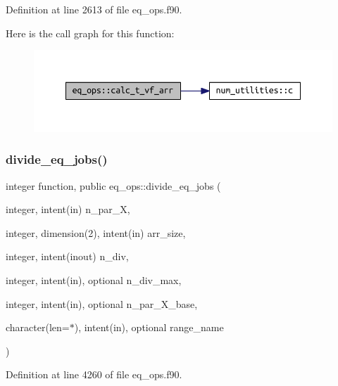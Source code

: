 Definition at line 2613 of file eq\+\_\+ops.\+f90.

Here is the call graph for this function\+:
\nopagebreak
\begin{figure}[H]
\begin{center}
\leavevmode
\includegraphics[width=350pt]{namespaceeq__ops_a9fe661ac183df2bdf7a96b4450be21aa_cgraph}
\end{center}
\end{figure}
\mbox{\label{namespaceeq__ops_a8fae749abe55865d8135fef536a8e8f1}} 
\subsubsection{\texorpdfstring{divide\+\_\+eq\+\_\+jobs()}{divide\_eq\_jobs()}}
{\footnotesize\ttfamily integer function, public eq\+\_\+ops\+::divide\+\_\+eq\+\_\+jobs (\begin{DoxyParamCaption}\item[{integer, intent(in)}]{n\+\_\+par\+\_\+X,  }\item[{integer, dimension(2), intent(in)}]{arr\+\_\+size,  }\item[{integer, intent(inout)}]{n\+\_\+div,  }\item[{integer, intent(in), optional}]{n\+\_\+div\+\_\+max,  }\item[{integer, intent(in), optional}]{n\+\_\+par\+\_\+\+X\+\_\+base,  }\item[{character(len=$\ast$), intent(in), optional}]{range\+\_\+name }\end{DoxyParamCaption})}



Definition at line 4260 of file eq\+\_\+ops.\+f90.

